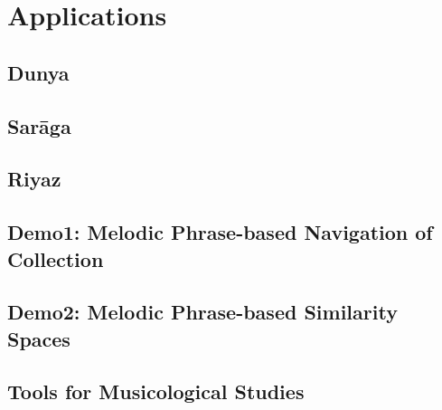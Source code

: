 
\chapter{Applications}

\section{Dunya}
\section{Sar\={a}ga}
\section{Riyaz}
\section {Demo1: Melodic Phrase-based Navigation of Collection}
\section {Demo2: Melodic Phrase-based Similarity Spaces}
\section {Tools for Musicological Studies}



